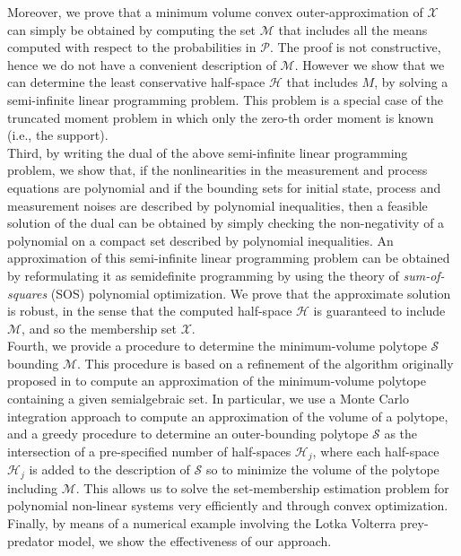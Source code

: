 \documentclass[twocolumn]{autart}
\newcommand{\DP}[1]{{#1}}
\begin{document}
Moreover, we prove that a minimum volume convex outer-approximation of  $\mathcal{X}$ can simply be obtained by computing the set $\mathcal{M}$  that includes all the means computed \DP{with respect to}  the probabilities in $\mathcal{P}$.
The proof is not constructive, hence we do not have a convenient description of $\mathcal{M}$. However we show that we can determine the least conservative
half-space $\mathcal{H}$ that includes $M$, by solving a semi-infinite linear programming problem.
This problem is a special case of the truncated moment problem  
\cite{shohat1950problem,kreuin1977markov,lasserre2010moments} in which only the zero-th order moment is known (i.e., the 
support).\\
Third, by writing the dual of the above semi-infinite linear programming problem, we show that, if the nonlinearities in 
the measurement and process equations are polynomial and if the bounding sets for initial state, process and measurement 
noises are described by polynomial inequalities, then
a feasible solution of the dual can be obtained by simply checking the non-negativity  of a polynomial on a compact set described by polynomial inequalities.
An approximation of this semi-infinite linear programming problem can be
obtained by reformulating it as  semidefinite programming by using the theory of \emph{sum-of-squares} (SOS) polynomial optimization.
We prove that the approximate solution is robust, in the sense that the computed half-space $\mathcal{H}$  is guaranteed 
to include  $\mathcal{M}$, and so the membership set  $\mathcal{X}$.\\
Fourth,  we provide a procedure to determine the minimum-volume polytope $\mathcal{S}$  bounding $\mathcal{M}$.  This  procedure is based on a refinement of the algorithm originally proposed   in \cite{piga2012polytopic}  to compute an approximation of the minimum-volume polytope containing a given semialgebraic set.
In particular, we use a Monte Carlo integration approach to compute an approximation of the volume of a polytope,
and a greedy procedure to determine an outer-bounding polytope  $\mathcal{S}$ as the intersection of a pre-specified number of half-spaces $\mathcal{H}_j$, where each half-space $\mathcal{H}_j$ is added to the description of $\mathcal{S}$ so to minimize the volume of the polytope including $\mathcal{M}$. 
This allows us to solve the set-membership estimation problem for polynomial non-linear systems very efficiently and through convex optimization. %
\\ Finally, by means of a numerical example involving the Lotka Volterra prey-predator model, we show the effectiveness 
of our approach.
\end{document}
